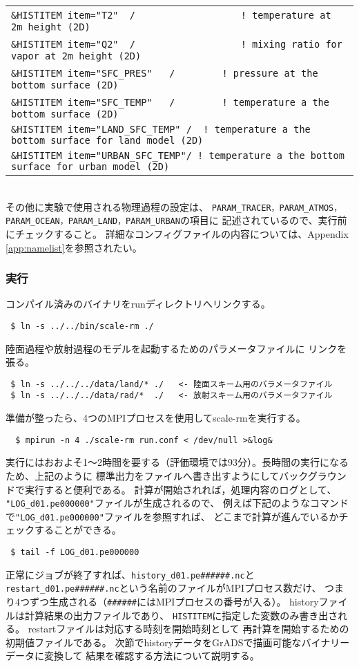{{{\begin{tabularx}{150mm}{l}
\verb|&HISTITEM item="T2"  / 　     　  　    　! temperature at 2m height (2D)| \\
\verb|&HISTITEM item="Q2"  / 　     　  　    　! mixing ratio for vapor at 2m height (2D)| \\
\verb|&HISTITEM item="SFC_PRES"   / 　    　! pressure at the bottom surface (2D)| \\
\verb|&HISTITEM item="SFC_TEMP"   / 　    　! temperature a the bottom surface (2D)| \\
\verb|&HISTITEM item="LAND_SFC_TEMP" /  ! temperature a the bottom surface for land model (2D)| \\
\verb|&HISTITEM item="URBAN_SFC_TEMP"/ ! temperature a the bottom surface for urban model (2D)| \\
\end{tabularx}
}}}\\

\noindent その他に実験で使用される物理過程の設定は、
\verb|PARAM_TRACER，PARAM_ATMOS，PARAM_OCEAN，PARAM_LAND，PARAM_URBAN|の項目に
記述されているので、実行前にチェックすること。
詳細なコンフィグファイルの内容については、Appendix \ref{app:namelist}を参照されたい。

%
\subsubsection{実行}
コンパイル済みのバイナリをrunディレクトリへリンクする。

\begin{verbatim}
 $ ln -s ../../bin/scale-rm ./
\end{verbatim}
陸面過程や放射過程のモデルを起動するためのパラメータファイルに
リンクを張る。
\begin{verbatim}
 $ ln -s ../../../data/land/* ./   <- 陸面スキーム用のパラメータファイル
 $ ln -s ../../../data/rad/*  ./   <- 放射スキーム用のパラメータファイル
\end{verbatim}
準備が整ったら、4つのMPIプロセスを使用してscale-rmを実行する。
\begin{verbatim}
  $ mpirun -n 4 ./scale-rm run.conf < /dev/null >&log&
\end{verbatim}

実行にはおおよそ1〜2時間を要する（評価環境では93分）。長時間の実行になるため、上記のように
標準出力をファイルへ書き出すようにしてバックグラウンドで実行すると便利である。
計算が開始されれば，処理内容のログとして、
\verb|"LOG_d01.pe000000"|ファイルが生成されるので、
例えば下記のようなコマンドで\verb|"LOG_d01.pe000000"|ファイルを参照すれば、
どこまで計算が進んでいるかチェックすることができる。
\begin{verbatim}
 $ tail -f LOG_d01.pe000000
\end{verbatim}
正常にジョブが終了すれば、\verb|history_d01.pe######.nc|と
\verb|restart_d01.pe######.nc|という名前のファイルがMPIプロセス数だけ、
つまり4つずつ生成される（\verb|######|にはMPIプロセスの番号が入る）。
historyファイルは計算結果の出力ファイルであり、
\verb|HISTITEM|に指定した変数のみ書き出される。
restartファイルは対応する時刻を開始時刻として
再計算を開始するための初期値ファイルである。
次節でhistoryデータをGrADSで描画可能なバイナリーデータに変換して
結果を確認する方法について説明する。


